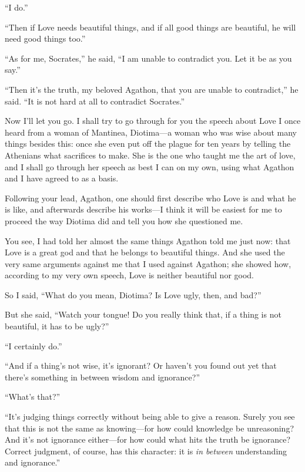 “I do.”

“Then if Love needs beautiful things, and if all good things are
beautiful, he will need good things too.”

“As for me, Socrates,” he said, “I am unable to contradict you. Let it
be as you say.”

“Then it's the truth, my beloved Agathon, that you are unable to
contradict,” he said. “It is not hard at all to contradict
Socrates.”

\blank[line]

 Now I'll let you go. I shall try to go through for you the
speech about Love I once heard from a woman of Mantinea, Diotima---a
woman who was wise about many things besides this: once she even put off
the plague for ten years by telling the Athenians what sacrifices to
make. She is the one who taught me the art of love, and I shall go
through her speech as best I can on my own, using what Agathon and I
have agreed to as a basis.

Following your lead, Agathon, one should first describe who Love is
 and what he is like, and afterwards describe his works---I think
it will be easiest for me to proceed the way Diotima did and tell you
how she questioned me.

You see, I had told her almost the same things Agathon told me just now:
that Love is a great god and that he belongs to beautiful
things. And she used
the very same arguments against me that I used against Agathon; she
showed how, according to my very own speech, Love is neither beautiful
nor good.

So I said, “What do you mean, Diotima? Is Love ugly, then, and bad?”

 But she said, “Watch your tongue! Do you really think
that, if a thing is not beautiful, it has to be ugly?”

“I certainly do.”

“And if a thing's not wise, it's ignorant? Or haven't you found out yet
that there's something in between wisdom and ignorance?”

“What's that?”

“It's judging things correctly without being able to give a reason.
Surely you see that this is not the same as knowing---for how could
knowledge be unreasoning? And it's not ignorance either---for how could
what hits the truth be ignorance? Correct judgment, of course, has this
character: it is {\em in between} understanding and ignorance.”

